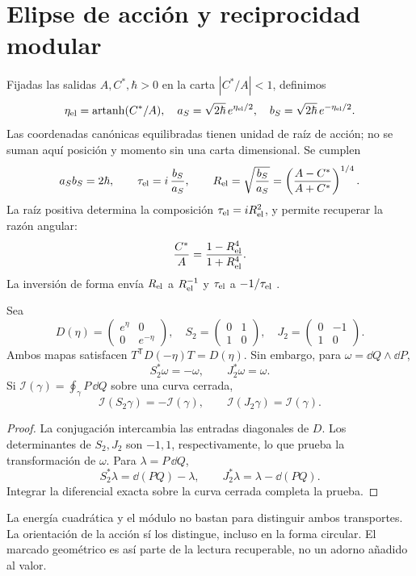 \section{Elipse de acción y reciprocidad modular}
\label{sec:ellipse}
Fijadas las salidas $A,C^*,\hbar>0$ en la carta
$|C^*/A|<1$, definimos
\[
\eta_{\rm el}=\operatorname{artanh}(C^*/A),\quad
a_S=\sqrt{2\hbar}\,e^{\eta_{\rm el}/2},\quad
b_S=\sqrt{2\hbar}\,e^{-\eta_{\rm el}/2}.
\]
Las coordenadas canónicas equilibradas tienen unidad de raíz de acción;
no se suman aquí posición y momento sin una carta dimensional.
Se cumplen
\[
a_Sb_S=2\hbar,\qquad
\tau_{\rm el}=i\,\frac{b_S}{a_S},\qquad
R_{\rm el}=\sqrt{\frac{b_S}{a_S}}
=\left(\frac{A-C^*}{A+C^*}\right)^{1/4}.
\]
La raíz positiva determina la composición $\tau_{\rm el}=iR_{\rm el}^2$,
y permite recuperar la razón angular:
\[
\frac{C^*}{A}=\frac{1-R_{\rm el}^4}{1+R_{\rm el}^4}.
\]
La inversión de forma envía $R_{\rm el}$ a $R_{\rm el}^{-1}$ y
$\tau_{\rm el}$ a $-1/\tau_{\rm el}$ \cite{elipse}.

\begin{proposition}
Sea
\[
D(\eta)=\begin{pmatrix}e^\eta&0\\0&e^{-\eta}\end{pmatrix},
\quad
S_2=\begin{pmatrix}0&1\\1&0\end{pmatrix},
\quad
J_2=\begin{pmatrix}0&-1\\1&0\end{pmatrix}.
\]
Ambos mapas satisfacen $T^{\mathsf T}D(-\eta)T=D(\eta)$.
Sin embargo, para $\omega=\dd Q\wedge\dd P$,
\[
S_2^*\omega=-\omega,\qquad J_2^*\omega=\omega.
\]
Si $\mathcal I(\gamma)=\oint_\gamma P\,\dd Q$ sobre una curva cerrada,
\[
\mathcal I(S_2\gamma)=-\mathcal I(\gamma),\qquad
\mathcal I(J_2\gamma)=\mathcal I(\gamma).
\]
\end{proposition}
\begin{proof}
La conjugación intercambia las entradas diagonales de $D$.
Los determinantes de $S_2,J_2$ son $-1,1$, respectivamente, lo que
prueba la transformación de $\omega$. Para $\lambda=P\,\dd Q$,
\[
S_2^*\lambda=\dd(PQ)-\lambda,\qquad
J_2^*\lambda=\lambda-\dd(PQ).
\]
Integrar la diferencial exacta sobre la curva cerrada completa la prueba.
\end{proof}

La energía cuadrática y el módulo no bastan para distinguir ambos
transportes. La orientación de la acción sí los distingue, incluso
en la forma circular. El marcado geométrico es así parte de la lectura
recuperable, no un adorno añadido al valor.

